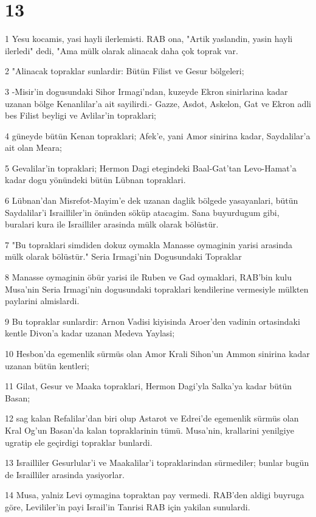 \chapter{13}

\par 1 Yesu kocamis, yasi hayli ilerlemisti. RAB ona, "Artik yaslandin, yasin hayli ilerledi" dedi, "Ama mülk olarak alinacak daha çok toprak var.
\par 2 "Alinacak topraklar sunlardir: Bütün Filist ve Gesur bölgeleri;
\par 3 -Misir'in dogusundaki Sihor Irmagi'ndan, kuzeyde Ekron sinirlarina kadar uzanan bölge Kenanlilar'a ait sayilirdi.- Gazze, Asdot, Askelon, Gat ve Ekron adli bes Filist beyligi ve Avlilar'in topraklari;
\par 4 güneyde bütün Kenan topraklari; Afek'e, yani Amor sinirina kadar, Saydalilar'a ait olan Meara;
\par 5 Gevalilar'in topraklari; Hermon Dagi etegindeki Baal-Gat'tan Levo-Hamat'a kadar dogu yönündeki bütün Lübnan topraklari.
\par 6 Lübnan'dan Misrefot-Mayim'e dek uzanan daglik bölgede yasayanlari, bütün Saydalilar'i Israilliler'in önünden söküp atacagim. Sana buyurdugum gibi, buralari kura ile Israilliler arasinda mülk olarak bölüstür.
\par 7 "Bu topraklari simdiden dokuz oymakla Manasse oymaginin yarisi arasinda mülk olarak bölüstür." Seria Irmagi'nin Dogusundaki Topraklar
\par 8 Manasse oymaginin öbür yarisi ile Ruben ve Gad oymaklari, RAB'bin kulu Musa'nin Seria Irmagi'nin dogusundaki topraklari kendilerine vermesiyle mülkten paylarini almislardi.
\par 9 Bu topraklar sunlardir: Arnon Vadisi kiyisinda Aroer'den vadinin ortasindaki kentle Divon'a kadar uzanan Medeva Yaylasi;
\par 10 Hesbon'da egemenlik sürmüs olan Amor Krali Sihon'un Ammon sinirina kadar uzanan bütün kentleri;
\par 11 Gilat, Gesur ve Maaka topraklari, Hermon Dagi'yla Salka'ya kadar bütün Basan;
\par 12 sag kalan Refalilar'dan biri olup Astarot ve Edrei'de egemenlik sürmüs olan Kral Og'un Basan'da kalan topraklarinin tümü. Musa'nin, krallarini yenilgiye ugratip ele geçirdigi topraklar bunlardi.
\par 13 Israilliler Gesurlular'i ve Maakalilar'i topraklarindan sürmediler; bunlar bugün de Israilliler arasinda yasiyorlar.
\par 14 Musa, yalniz Levi oymagina topraktan pay vermedi. RAB'den aldigi buyruga göre, Levililer'in payi Israil'in Tanrisi RAB için yakilan sunulardi.
